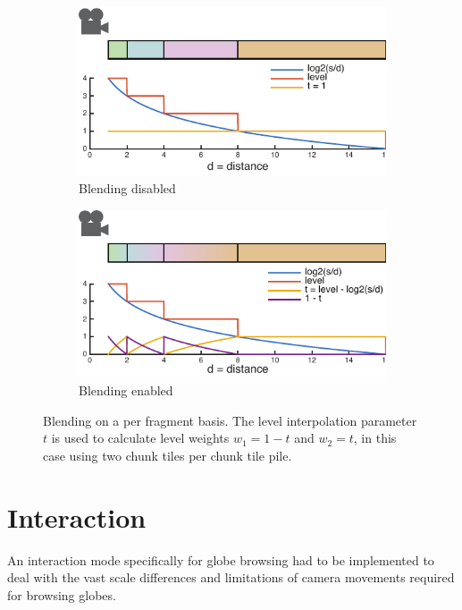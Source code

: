 \begin{figure}[htbp]
    \centering
    \begin{subfigure}[tb]{0.49\textwidth}
    	\includegraphics[width=\textwidth]{figures/implementation/rendering/blending1.pdf}
	\caption{Blending disabled}
    \end{subfigure}
    \begin{subfigure}[tb]{0.49\textwidth}
    	\includegraphics[width=\textwidth]{figures/implementation/rendering/blending2.pdf}
	\caption{Blending enabled}
    \end{subfigure}
    \caption{Blending on a per fragment basis. The level interpolation parameter $t$ is used to calculate level weights $w_1 = 1-t$ and $w_2 = t$, in this case using two chunk tiles per chunk tile pile.}
    \label{fig:switchingblending}
\end{figure}

\section{Interaction}

An interaction mode specifically for globe browsing had to be implemented to deal with the vast scale differences and limitations of camera movements required for browsing globes. 

